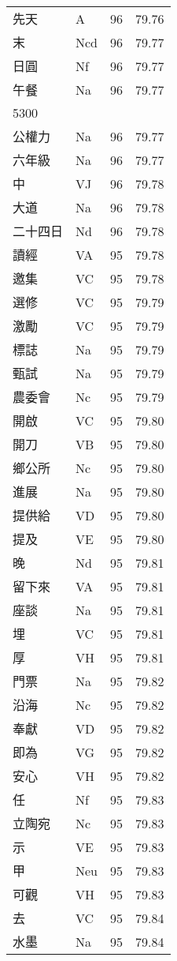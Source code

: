 \documentclass[twocolumn]{book}
\begin{document}
\begin{supertabular}{llrr}
先天 & A & 96 &  79.76\\
末 & Ncd & 96 &  79.77\\
日圓 & Nf & 96 &  79.77\\
午餐 & Na & 96 &  79.77\\
5300\\
公權力 & Na & 96 &  79.77\\
六年級 & Na & 96 &  79.77\\
中 & VJ & 96 &  79.78\\
大道 & Na & 96 &  79.78\\
二十四日 & Nd & 96 &  79.78\\
讀經 & VA & 95 &  79.78\\
邀集 & VC & 95 &  79.78\\
選修 & VC & 95 &  79.79\\
激勵 & VC & 95 &  79.79\\
標誌 & Na & 95 &  79.79\\
甄試 & Na & 95 &  79.79\\
農委會 & Nc & 95 &  79.79\\
開啟 & VC & 95 &  79.80\\
開刀 & VB & 95 &  79.80\\
鄉公所 & Nc & 95 &  79.80\\
進展 & Na & 95 &  79.80\\
提供給 & VD & 95 &  79.80\\
提及 & VE & 95 &  79.80\\
晚 & Nd & 95 &  79.81\\
留下來 & VA & 95 &  79.81\\
座談 & Na & 95 &  79.81\\
埋 & VC & 95 &  79.81\\
厚 & VH & 95 &  79.81\\
門票 & Na & 95 &  79.82\\
沿海 & Nc & 95 &  79.82\\
奉獻 & VD & 95 &  79.82\\
即為 & VG & 95 &  79.82\\
安心 & VH & 95 &  79.82\\
任 & Nf & 95 &  79.83\\
立陶宛 & Nc & 95 &  79.83\\
示 & VE & 95 &  79.83\\
甲 & Neu & 95 &  79.83\\
可觀 & VH & 95 &  79.83\\
去 & VC & 95 &  79.84\\
水墨 & Na & 95 &  79.84\\

\end{supertabular}
\end{document}
